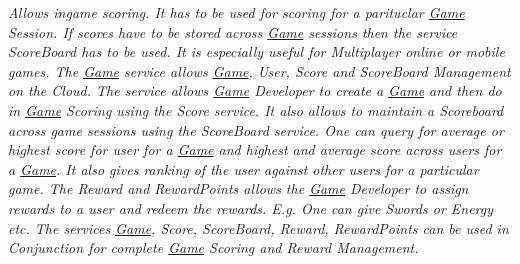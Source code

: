\begin{DoxyCompactItemize}
\begin{DoxyCompactList}\small\item\em Allows ingame scoring. It has to be used for scoring for a parituclar \hyperlink{classcom_1_1shephertz_1_1app42_1_1paas_1_1sdk_1_1csharp_1_1game_1_1_game}{Game} Session. If scores have to be stored across \hyperlink{classcom_1_1shephertz_1_1app42_1_1paas_1_1sdk_1_1csharp_1_1game_1_1_game}{Game} sessions then the service Score\+Board has to be used. It is especially useful for Multiplayer online or mobile games. The \hyperlink{classcom_1_1shephertz_1_1app42_1_1paas_1_1sdk_1_1csharp_1_1game_1_1_game}{Game} service allows \hyperlink{classcom_1_1shephertz_1_1app42_1_1paas_1_1sdk_1_1csharp_1_1game_1_1_game}{Game}, User, Score and Score\+Board Management on the Cloud. The service allows \hyperlink{classcom_1_1shephertz_1_1app42_1_1paas_1_1sdk_1_1csharp_1_1game_1_1_game}{Game} Developer to create a \hyperlink{classcom_1_1shephertz_1_1app42_1_1paas_1_1sdk_1_1csharp_1_1game_1_1_game}{Game} and then do in \hyperlink{classcom_1_1shephertz_1_1app42_1_1paas_1_1sdk_1_1csharp_1_1game_1_1_game}{Game} Scoring using the Score service. It also allows to maintain a Scoreboard across game sessions using the Score\+Board service. One can query for average or highest score for user for a \hyperlink{classcom_1_1shephertz_1_1app42_1_1paas_1_1sdk_1_1csharp_1_1game_1_1_game}{Game} and highest and average score across users for a \hyperlink{classcom_1_1shephertz_1_1app42_1_1paas_1_1sdk_1_1csharp_1_1game_1_1_game}{Game}. It also gives ranking of the user against other users for a particular game. The Reward and Reward\+Points allows the \hyperlink{classcom_1_1shephertz_1_1app42_1_1paas_1_1sdk_1_1csharp_1_1game_1_1_game}{Game} Developer to assign rewards to a user and redeem the rewards. E.\+g. One can give Swords or Energy etc. The services \hyperlink{classcom_1_1shephertz_1_1app42_1_1paas_1_1sdk_1_1csharp_1_1game_1_1_game}{Game}, Score, Score\+Board, Reward, Reward\+Points can be used in Conjunction for complete \hyperlink{classcom_1_1shephertz_1_1app42_1_1paas_1_1sdk_1_1csharp_1_1game_1_1_game}{Game} Scoring and Reward Management. \end{DoxyCompactList}\end{DoxyCompactItemize}
